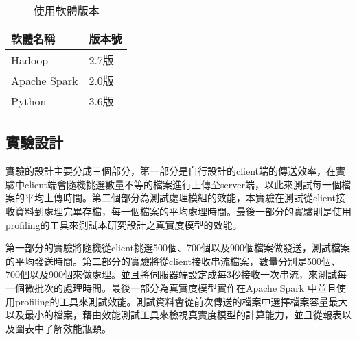 \begin{table}[H]
\caption{使用軟體版本}
\label{software}
\begin{center}
\begin{tabular}{|p{3cm}<{\centering}|p{3cm}<{\centering}|}
\hline
軟體名稱 & 版本號\\
\hline
Hadoop & 2.7版\\
\hline
Apache Spark &2.0版\\
\hline
Python & 3.6版\\
\hline
\end{tabular}
\end{center}
\end{table}

\newpage
\subsection{實驗設計}
實驗的設計主要分成三個部分，第一部分是自行設計的client端的傳送效率，在實驗中client端會隨機挑選數量不等的檔案進行上傳至server端，以此來測試每一個檔案的平均上傳時間。第二個部分為測試處理模組的效能，本實驗在測試從client接收資料到處理完畢存檔，每一個檔案的平均處理時間。最後一部分的實驗則是使用profiling的工具來測試本研究設計之真實度模型的效能。 \\\par %
第一部分的實驗將隨機從client挑選500個、700個以及900個檔案做發送，測試檔案的平均發送時間。第二部分的實驗將從client接收串流檔案，數量分別是500個、700個以及900個來做處理。並且將伺服器端設定成每3秒接收一次串流，來測試每一個微批次的處理時間。最後一部分為真實度模型實作在Apache Spark 中並且使用profiling的工具來測試效能。測試資料會從前次傳送的檔案中選擇檔案容量最大以及最小的檔案，藉由效能測試工具來檢視真實度模型的計算能力，並且從報表以及圖表中了解效能瓶頸。

